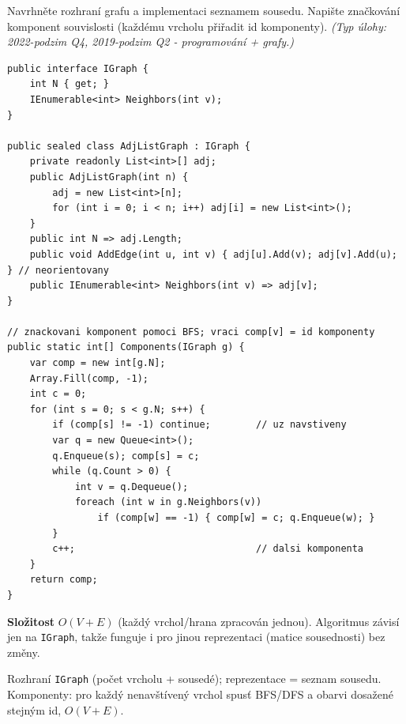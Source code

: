 \begin{zadani}
Navrhněte rozhraní grafu a implementaci seznamem sousedu. Napište značkování komponent souvislosti (každému vrcholu přiřadit id komponenty). \emph{(Typ úlohy: 2022-podzim Q4, 2019-podzim Q2 - programování + grafy.)}
\end{zadani}

\begin{reseni}
\begin{lstlisting}
public interface IGraph {
    int N { get; }
    IEnumerable<int> Neighbors(int v);
}

public sealed class AdjListGraph : IGraph {
    private readonly List<int>[] adj;
    public AdjListGraph(int n) {
        adj = new List<int>[n];
        for (int i = 0; i < n; i++) adj[i] = new List<int>();
    }
    public int N => adj.Length;
    public void AddEdge(int u, int v) { adj[u].Add(v); adj[v].Add(u); } // neorientovany
    public IEnumerable<int> Neighbors(int v) => adj[v];
}

// znackovani komponent pomoci BFS; vraci comp[v] = id komponenty
public static int[] Components(IGraph g) {
    var comp = new int[g.N];
    Array.Fill(comp, -1);
    int c = 0;
    for (int s = 0; s < g.N; s++) {
        if (comp[s] != -1) continue;        // uz navstiveny
        var q = new Queue<int>();
        q.Enqueue(s); comp[s] = c;
        while (q.Count > 0) {
            int v = q.Dequeue();
            foreach (int w in g.Neighbors(v))
                if (comp[w] == -1) { comp[w] = c; q.Enqueue(w); }
        }
        c++;                                // dalsi komponenta
    }
    return comp;
}
\end{lstlisting}
\textbf{Složitost} $O(V+E)$ (každý vrchol/hrana zpracován jednou). Algoritmus závisí jen na \texttt{IGraph}, takže funguje i pro jinou reprezentaci (matice sousednosti) bez změny.
\end{reseni}

\begin{jadro}
Rozhraní \texttt{IGraph} (počet vrcholu + sousedé); reprezentace = seznam sousedu. Komponenty: pro každý nenavštívený vrchol spusť BFS/DFS a obarvi dosažené stejným id, $O(V+E)$.
\end{jadro}

